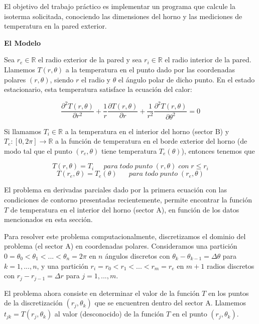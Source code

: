 El objetivo del trabajo práctico es implementar un programa que calcule la isoterma solicitada, conociendo las dimensiones del horno y las mediciones de temperatura en la pared exterior.

{\bf El Modelo}

Sea $r_e \in \mathbb{R}$ el radio exterior de la pared y sea $r_i \in \mathbb{R}$ el radio interior de la pared. Llamemos $T(r,\theta)$ a la temperatura en el punto dado por las coordenadas polares $(r,\theta)$, siendo $r$ el radio y $\theta$ el \'angulo polar de dicho punto. En el estado estacionario, esta temperatura satisface la ecuaci\'on del calor:

\begin{equation}\label{calor}
\frac{\partial^2T(r,\theta)}{\partial r^2}+\frac{1}{r}\frac{\partial T(r,\theta)}{\partial r}+\frac{1}{r^2}\frac{\partial^2T(r,\theta)}{\partial \theta^2} = 0 
\end{equation}


Si llamamos $T_i \in \mathbb{R}$ a la temperatura en el interior del horno (sector B) y $T_e : [0,2\pi] \rightarrow \mathbb{R}$ a la funci\'on de temperatura en el borde exterior del horno (de modo tal que el punto $(r_e,\theta)$ tiene temperatura $T_e(\theta)$), entonces tenemos que

\begin{equation}
T(r,\theta) = T_i \;\;\;\;\;para\;todo\;punto\;(r,\theta)\;con\;r\leq r_i
\end{equation}
\begin{equation}
T(r_e,\theta) = T_e(\theta) \;\;\;\;\;\;para\;todo\;punto\;(r_e,\theta)
\end{equation}


El problema en derivadas parciales dado por la primera ecuaci\'on con las condiciones de contorno presentadas recientemente, permite encontrar la funci\'on $T$ de temperatura en el interior del horno (sector A), en funci\'on de los datos mencionados en esta secci\'on.

Para resolver este problema computacionalmente, discretizamos el dominio del problema (el sector A) en coordenadas polares. Consideramos una partici\'on $0 = \theta_0 < \theta_1 < ... < \theta_n = 2\pi$ en $n$ \'angulos discretos con $\theta_k-\theta_{k-1} = \Delta\theta$ para $k = 1,...,n$, y una partici\'on $r_i = r_0 < r_1 < ... < r_m = r_e$ en $m+1$ radios discretos con $r_j - r_{j-1} = \Delta r$ para $j = 1,...,m$.

\medskip

El problema ahora consiste en determinar el valor de la funci\'on $T$ en los puntos de la discretizaci\'on $(r_j,\theta_k)$ que se encuentren dentro del sector A. Llamemos $t_{jk} = T(r_j,\theta_k)$ al valor (desconocido) de la funci\'on $T$ en el punto $(r_j,\theta_k)$.

